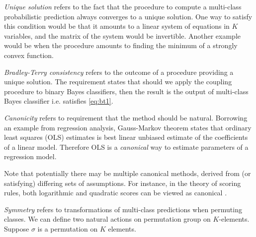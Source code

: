 %



\emph{Unique solution} refers to the fact that the procedure to compute a multi-class probabilistic prediction always converges to a unique solution. One way to satisfy this condition would be that it amounts to a linear system of equations in $K$ variables, and the matrix of the system would be invertible. Another example would be when the procedure amounts to finding the minimum of a strongly convex function. 

\emph{Bradley-Terry consistency} refers to the outcome of a procedure providing a unique solution. The requirement states that should we apply the coupling procedure to binary Bayes classifiers, then the result is the output of multi-class Bayes classifier i.e. satisfies \eqref{eq:bt1}.

\emph{Canonicity} refers to requirement that the method should be natural. Borrowing an example from regression analysis, Gauss-Markov theorem states that ordinary least squares (OLS) estimates is best linear unbiased estimate of the coefficients of a linear model. Therefore OLS  is a \emph{canonical} way to estimate parameters of a regression model. 

Note that potentially there may be multiple canonical methods, derived from (or satisfying) differing sets of assumptions. For instance, in the theory of scoring rules, both logarithmic and quadratic scores can be viewed as canonical \cite{shannon1948mathematical,selten1998axiomatic}.

\emph{Symmetry} refers to transformations of multi-class predictions when permuting classes. We can define two natural actions on permutation group on $K$-elements. Suppose $\sigma$ is a permutation on $K$ elements. 

